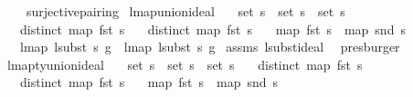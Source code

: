 \begin{isabellebody}
\ \ \ \ surjective{\isacharunderscore}{\kern0pt}pairing{\isacharparenright}{\kern0pt}%
\endisatagproof
{\isafoldproof}%
%
\isadelimproof
\isanewline
%
\endisadelimproof
\isanewline
\isanewline
{}\isamarkupfalse%
\ lmap{\isacharunderscore}{\kern0pt}union{\isacharunderscore}{\kern0pt}ideal{\isacharcolon}{\kern0pt}\isanewline
\ \ \ {\isachardoublequoteopen}set\ s\ {\isacharequal}{\kern0pt}\ set\ s{}\ {\isasymunion}\ set\ s{}{\isachardoublequoteclose}\isanewline
\ \ \ {\isachardoublequoteopen}distinct\ {\isacharparenleft}{\kern0pt}map\ fst\ s{\isacharparenright}{\kern0pt}{\isachardoublequoteclose}\isanewline
\ \ \ {\isachardoublequoteopen}distinct\ {\isacharparenleft}{\kern0pt}map\ fst\ s{}{\isacharparenright}{\kern0pt}{\isachardoublequoteclose}\isanewline
\ \ \ {\isachardoublequoteopen}map\ fst\ s{}\ {\isacharequal}{\kern0pt}\ map\ snd\ s{}{\isachardoublequoteclose}\isanewline
\ \ \ {\isachardoublequoteopen}lmap\ {\isacharparenleft}{\kern0pt}lsubst\ s{\isacharparenright}{\kern0pt}\ g\ {\isacharequal}{\kern0pt}\ lmap\ {\isacharparenleft}{\kern0pt}lsubst\ s{}{\isacharparenright}{\kern0pt}\ g{\isachardoublequoteclose}\isanewline
%
\isadelimproof
%
\endisadelimproof
%
\isatagproof
{}\isamarkupfalse%
\ assms{\isacharparenleft}{\kern0pt}{}{\isacharcomma}{\kern0pt}{}{\isacharcomma}{\kern0pt}{}{\isacharcomma}{\kern0pt}{}{\isacharparenright}{\kern0pt}\ lsubst{\isacharunderscore}{\kern0pt}ideal\ \isamarkupfalse%
\ presburger%
\endisatagproof
{\isafoldproof}%
%
\isadelimproof
\isanewline
%
\endisadelimproof
\isanewline
\isanewline
{}\isamarkupfalse%
\ lmap{\isacharunderscore}{\kern0pt}ty{\isacharunderscore}{\kern0pt}union{\isacharunderscore}{\kern0pt}ideal{\isacharcolon}{\kern0pt}\isanewline
\ \ \ {\isachardoublequoteopen}set\ s\ {\isacharequal}{\kern0pt}\ set\ s{}\ {\isasymunion}\ set\ s{}{\isachardoublequoteclose}\isanewline
\ \ \ {\isachardoublequoteopen}distinct\ {\isacharparenleft}{\kern0pt}map\ fst\ s{\isacharparenright}{\kern0pt}{\isachardoublequoteclose}\isanewline
\ \ \ {\isachardoublequoteopen}distinct\ {\isacharparenleft}{\kern0pt}map\ fst\ s{}{\isacharparenright}{\kern0pt}{\isachardoublequoteclose}\isanewline
\ \ \ {\isachardoublequoteopen}map\ fst\ s{}\ {\isacharequal}{\kern0pt}\ map\ snd\ s{}{\isachardoublequoteclose}\isanewline

\end{isabellebody}
